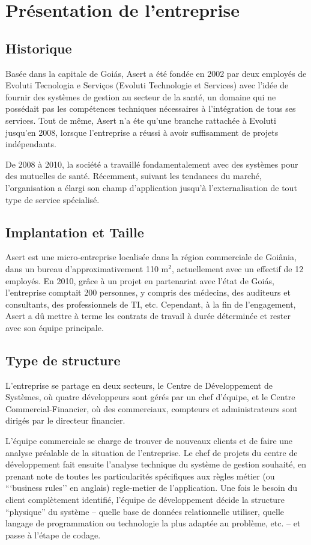 \chapter{Présentation de l’entreprise}
\section{Historique}

Basée dans la capitale de Goiás, Asert a été fondée en 2002 par deux employés de Evoluti Tecnologia e Serviços (Evoluti Technologie et Services) avec l'idée de fournir des systèmes de gestion au secteur de la santé, un domaine qui ne possédait pas les compétences techniques nécessaires à l'intégration de tous ses services. Tout de même, Asert n'a éte qu'une branche rattachée à Evoluti jusqu'en 2008, lorsque l'entreprise a réussi à avoir suffisamment de projets indépendants.

De 2008 à 2010, la société a travaillé fondamentalement avec des systèmes pour des mutuelles de santé. Récemment, suivant les tendances du marché, l'organisation a élargi son champ d'application jusqu'à l'externalisation de tout type de service spécialisé.

\section{Implantation et Taille}

Asert est une micro-entreprise localisée dans la région commerciale de Goiânia, dans un bureau d'approximativement 110 m$^2$, actuellement avec un effectif de 12 employés. En 2010, grâce à un projet en partenariat avec l'état de Goiás, l'entreprise comptait 200 personnes, y compris des médecins, des auditeurs et consultants, des professionnels de TI, etc. Cependant, à la fin de l'engagement, Asert a dû mettre à terme les contrats de travail à durée déterminée et rester avec son équipe principale.

\section{Type de structure}

L'entreprise se partage en deux secteurs, le Centre de Développement de Systèmes, où quatre développeurs sont gérés par un chef d'équipe, et le Centre Commercial-Financier, où des commerciaux, compteurs et administrateurs sont dirigés par le directeur financier.

L'équipe commerciale se charge de trouver de nouveaux clients et de faire une analyse préalable de la situation de l'entreprise. Le chef de projets du centre de développement fait ensuite l'analyse technique du système de gestion souhaité, en prenant note de toutes les particularités spécifiques aux règles métier (ou ```business rules'' en anglais) regle-metier de l'application. Une fois le besoin du client complètement identifié, l'équipe de développement décide la structure ``physique'' du système -- quelle base de données relationnelle utiliser, quelle langage de programmation ou technologie la plus adaptée au problème, etc. -- et passe à l'étape de codage.

